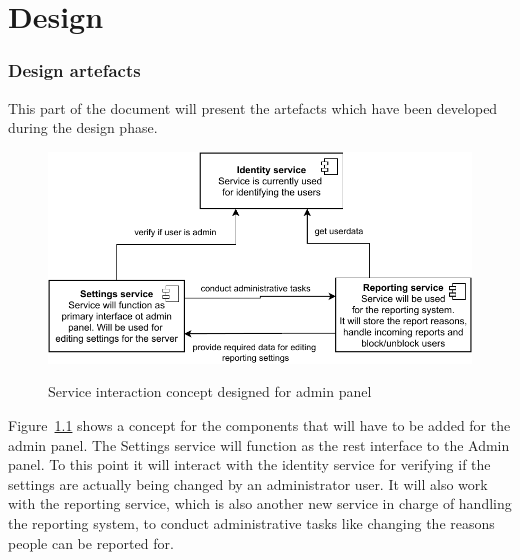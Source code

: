 

\chapter{Design}\label{ch:design}
\subsection{Design artefacts}
This part of the document will present the artefacts which have been developed during the design phase.

\begin{figure}[h]
	\centering
	\caption{Service interaction concept designed for admin panel}
	\includegraphics[width=1.0\textwidth]{./images/component_interaction.pdf}
	\label{fig:componentInteraction}
\end{figure}

Figure~\ref{fig:componentInteraction} shows a concept for the components that will have to be added for the admin panel. The Settings service will function as the rest interface to the Admin panel. To this point it will interact with the identity service for verifying if the settings are actually being changed by an administrator user. It will also work with the reporting service, which is also another new service in charge of handling the reporting system, to conduct administrative tasks like changing the reasons people can be reported for. 


